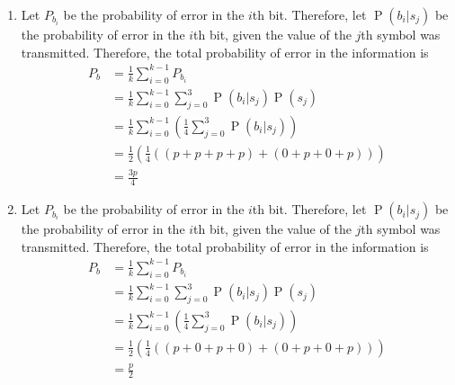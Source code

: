 \documentclass[titlepage, fleqn, a4paper, 12pt, twoside]{article}
\theoremstyle{definition}
\theoremstyle{theorem}
\DeclareMathOperator{\prob}{\mathrm{P}}
\begin{document}
\begin{solution}
	\begin{enumerate}
		\item
			Let $P_{b_i}$ be the probability of error in the $i$th bit.
			Therefore, let $\prob(b_i|s_j)$ be the probability of error in the $i$th bit, given the value of the $j$th symbol was transmitted.
			Therefore, the total probability of error in the information is
			\begin{align*}
				P_b &= \frac{1}{k} \sum\limits_{i = 0}^{k - 1} P_{b_i}\\
				&= \frac{1}{k} \sum\limits_{i = 0}^{k - 1} \sum\limits_{j = 0}^{3} \prob(b_i|s_j) \prob(s_j)\\
				&= \frac{1}{k} \sum\limits_{i = 0}^{k - 1} \left( \frac{1}{4} \sum\limits_{j = 0}^{3} \prob(b_i|s_j) \right)\\
				&= \frac{1}{2} \left( \frac{1}{4} \left( (p + p + p + p) + (0 + p + 0 + p) \right) \right)\\
				&= \frac{3 p}{4}
			\end{align*}
		\item
			Let $P_{b_i}$ be the probability of error in the $i$th bit.
			Therefore, let $\prob(b_i|s_j)$ be the probability of error in the $i$th bit, given the value of the $j$th symbol was transmitted.
			Therefore, the total probability of error in the information is
			\begin{align*}
				P_b &= \frac{1}{k} \sum\limits_{i = 0}^{k - 1} P_{b_i}\\
				&= \frac{1}{k} \sum\limits_{i = 0}^{k - 1} \sum\limits_{j = 0}^{3} \prob(b_i|s_j) \prob(s_j)\\
				&= \frac{1}{k} \sum\limits_{i = 0}^{k - 1} \left( \frac{1}{4} \sum\limits_{j = 0}^{3} \prob(b_i|s_j) \right)\\
				&= \frac{1}{2} \left( \frac{1}{4} \left( (p + 0 + p + 0) + (0 + p + 0 + p) \right) \right)\\
				&= \frac{p}{2}
			\end{align*}
	\end{enumerate}
\end{solution}
\end{document}
